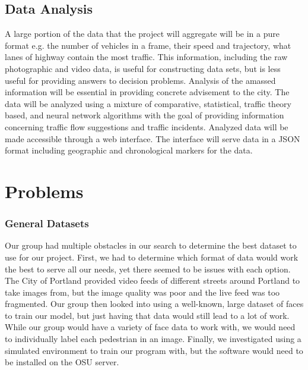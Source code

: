 \documentclass[onecolumn, draftclsnofoot,10pt, compsoc]{IEEEtran}
\begin{document}
\subsection{Data Analysis}
A large portion of the data that the project will aggregate will be in a pure format e.g. the number of vehicles in a frame, their speed and trajectory, what lanes of highway contain the most traffic. This information, including the raw photographic and video data, is useful for constructing data sets, but is less useful for providing answers to decision problems. Analysis of the amassed information will be essential in providing concrete advisement to the city.  
The data will be analyzed using a mixture of comparative, statistical,  traffic  theory  based,  and  neural  network  algorithms with the goal of providing information concerning traffic flow suggestions and traffic incidents. 
Analyzed data will be made accessible through a web interface. The interface will serve data in a JSON format including geographic and chronological markers for the data.

\section{Problems}
\subsubsection{General Datasets}
Our group had multiple obstacles in our search to determine the best dataset to use for our project. First, we had to determine which format of data would work the best to serve all our needs, yet there seemed to be issues with each option. The City of Portland provided video feeds of different streets around Portland to take images from, but the image quality was poor and the live feed was too fragmented. Our group then looked into using a well-known, large dataset of faces to train our model, but just having that data would still lead to a lot of work. While our group would have a variety of face data to work with, we would need to individually label each pedestrian in an image. Finally, we investigated using a simulated environment to train our program with, but the software would need to be installed on the OSU server. 
\end{document}
